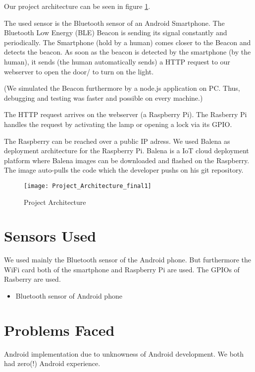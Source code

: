 \documentclass[
10pt, %
a4paper, %
oneside, %
headinclude,footinclude, %
BCOR5mm, %
]{scrartcl}
\begin{document}
Our project architecture can be seen in figure \ref{fig:projectarchitecturefinal}. 

The used sensor is the Bluetooth sensor of an Android Smartphone. The Bluetooth Low Energy (BLE) Beacon is sending its signal constantly and periodically. The Smartphone (hold by a human) comes closer to the Beacon and detects the beacon. As soon as the beacon is detected by the smartphone (by the human), it sends (the human automatically sends) a HTTP request to our webserver to open the door/ to turn on the light. 

(We simulated the Beacon furthermore by a node.js application on PC. Thus, debugging and testing was faster and possible on every machine.)

The HTTP request arrives on the webserver (a Raspberry Pi). The Rasberry Pi handles the request by activating the lamp or opening a lock via its GPIO.

The Raspberry can be reached over a public IP adress. We used Balena as deployment architecture for the Raspberry Pi. Balena is a IoT cloud deployment platform where Balena images can be downloaded and flashed on the Raspberry. The image auto-pulls the code which the developer pushs on his git repository.
 
 
\begin{figure}[h]
	\centering
	\texttt{[image: Project\_Architecture\_final1]}
	\caption{Project Architecture}
	\label{fig:projectarchitecturefinal}
\end{figure}

\section{Sensors Used}
We used mainly the Bluetooth sensor of the Android phone. But furthermore the WiFi card both of the smartphone and Raspberry Pi are used. The GPIOs of Rasberry are used.

\begin{itemize}
\item Bluetooth sensor of Android phone
\end{itemize}


\section{Problems Faced}
Android implementation due to unknowness of Android development. We both had zero(!) Android experience.
\end{document}
